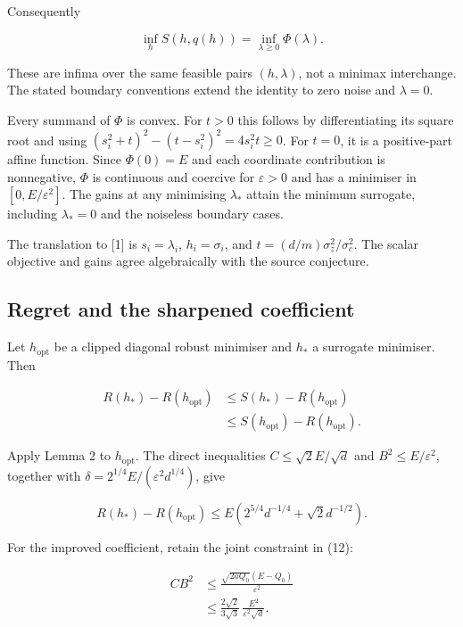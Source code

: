 \documentclass[11pt,a4paper]{article}
\begin{document}
Consequently

\[
\inf_h S(h,q(h))=\inf_{\lambda\ge0}\Phi(\lambda).
\tag{22}
\]

These are infima over the same feasible pairs \((h,\lambda)\), not a
minimax interchange. The stated boundary conventions extend the identity
to zero noise and \(\lambda=0\).

Every summand of \(\Phi\) is convex. For \(t>0\) this follows by
differentiating its square root and using
\((s_i^2+t)^2-(t-s_i^2)^2=4s_i^2t\ge0\). For \(t=0\), it is a
positive-part affine function. Since \(\Phi(0)=E\) and each coordinate
contribution is nonnegative, \(\Phi\) is continuous and coercive for
\(\varepsilon>0\) and has a minimiser in \([0,E/\varepsilon^2]\). The
gains at any minimising \(\lambda_*\) attain the minimum surrogate,
including \(\lambda_*=0\) and the noiseless boundary cases.

The translation to {[}1{]} is \(s_i=\lambda_i\), \(h_i=\sigma_i\), and
\(t=(d/m)\sigma_z^2/\sigma_c^2\). The scalar objective and gains agree
algebraically with the source conjecture.

\hypertarget{regret-and-the-sharpened-coefficient}{%
\subsection{Regret and the sharpened
coefficient}\label{regret-and-the-sharpened-coefficient}}

Let \(h_{\mathrm{opt}}\) be a clipped diagonal robust minimiser and
\(h_*\) a surrogate minimiser. Then

\[
\begin{aligned}
R(h_*)-R(h_{\mathrm{opt}})
&\le S(h_*)-R(h_{\mathrm{opt}})\\
&\le S(h_{\mathrm{opt}})-R(h_{\mathrm{opt}}).
\end{aligned}
\tag{23}
\]

Apply Lemma 2 to \(h_{\mathrm{opt}}\). The direct inequalities
\(C\le\sqrt2E/\sqrt d\) and \(B^2\le E/\varepsilon^2\), together with
\(\delta=2^{1/4}E/(\varepsilon^2d^{1/4})\), give

\[
R(h_*)-R(h_{\mathrm{opt}})
\le E\left(2^{5/4}d^{-1/4}+\sqrt2d^{-1/2}\right).
\tag{24}
\]

For the improved coefficient, retain the joint constraint in (12):

\[
\begin{aligned}
CB^2
&\le
\frac{\sqrt{2aQ_0}(E-Q_0)}{\varepsilon^2}\\
&\le
\frac{2\sqrt2}{3\sqrt3}\,
\frac{E^2}{\varepsilon^2\sqrt d}.
\end{aligned}
\tag{25}
\]
\end{document}
